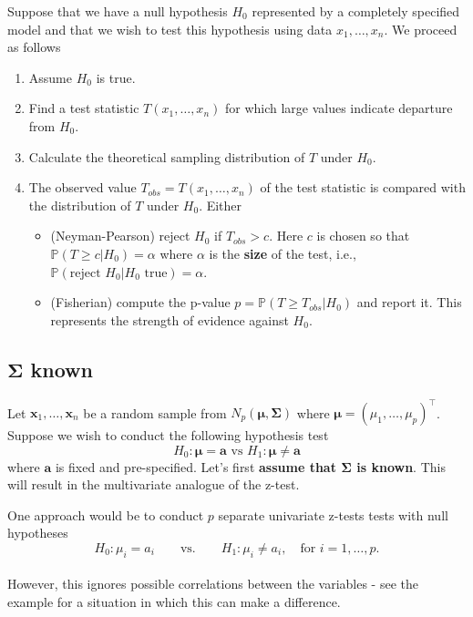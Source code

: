 \documentclass[]{book}
\providecommand{\tightlist}{%
  \setlength{\itemsep}{0pt}\setlength{\parskip}{0pt}}
\theoremstyle{definition}
\theoremstyle{definition}
\theoremstyle{definition}
\theoremstyle{remark}
\begin{document}
Suppose that we have a null hypothesis \(H_0\) represented by a completely specified model and that we wish to test this hypothesis using data \(x_1, \ldots, x_n\). We proceed as follows

\begin{enumerate}
\def\labelenumi{\arabic{enumi}.}
\item
  Assume \(H_0\) is true.
\item
  Find a test statistic \(T(x_1, \ldots, x_n)\) for which large values indicate departure from \(H_0\).
\item
  Calculate the theoretical sampling distribution of \(T\) under \(H_0\).
\item
  The observed value \(T_{obs}=T(x_1, \ldots, x_n)\) of the test statistic is compared with the distribution of \(T\) under \(H_0\). Either

  \begin{itemize}
  \tightlist
  \item
    (Neyman-Pearson) reject \(H_0\) if \(T_{obs}>c\). Here \(c\) is chosen so that \(\mathbb{P}(T\geq c| H_0)=\alpha\) where \(\alpha\) is the \textbf{size} of the test, i.e., \(\mathbb{P}(\mbox{reject } H_0 | H_0 \mbox{ true})=\alpha\).
  \item
    (Fisherian) compute the p-value \(p=\mathbb{P}(T\geq T_{obs}|H_0)\) and report it. This represents the strength of evidence against \(H_0\).
  \end{itemize}
\end{enumerate}

\hypertarget{onesampleSigma}{%
\subsection{\texorpdfstring{\(\boldsymbol \Sigma\) known}{\textbackslash{}boldsymbol \textbackslash{}Sigma known}}\label{onesampleSigma}}

Let \(\boldsymbol x_1,\ldots,\boldsymbol x_n\) be a random sample from \(N_p(\boldsymbol \mu,\boldsymbol \Sigma)\) where
\(\boldsymbol \mu= (\mu_1,\ldots,\mu_p)^\top\). Suppose we wish to conduct the following hypothesis test \[H_0: \boldsymbol \mu= \boldsymbol a\mbox{ vs } H_1: \boldsymbol \mu\neq \boldsymbol a\] where \(\boldsymbol a\) is fixed and pre-specified.
Let's first \textbf{assume that \(\boldsymbol \Sigma\) is known}. This will result in the multivariate analogue of the z-test.

One approach would be to conduct \(p\) separate univariate z-tests tests with null hypotheses
\[H_0: \mu_i = a_i \qquad \text{vs.} \qquad H_1: \mu_i \neq a_i, \quad \mbox{for } i=1,\ldots,p.\]\\
However, this ignores possible correlations between the variables - see the example for a situation in which this can make a difference.
\end{document}
